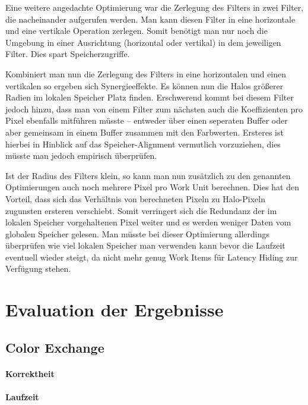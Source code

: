\documentclass[10pt,a4paper]{article}
\begin{document}
Eine weitere angedachte Optimierung war die Zerlegung des Filters in zwei Filter, die nacheinander aufgerufen werden. Man kann diesen Filter in eine horizontale und eine vertikale Operation zerlegen. Somit benötigt man nur noch die Umgebung in einer Ausrichtung (horizontal oder vertikal) in dem jeweiligen Filter. Dies spart Speicherzugriffe.


Kombiniert man nun die Zerlegung des Filters in eine horizontalen und einen vertikalen so ergeben sich Synergieeffekte. Es können nun die Halos größerer Radien im lokalen Speicher Platz finden. Erschwerend kommt bei diesem Filter jedoch hinzu, dass man von einem Filter zum nächsten auch die Koeffizienten pro Pixel ebenfalls mitführen müsste -- entweder über einen seperaten Buffer oder aber gemeinsam in einem Buffer zusammen mit den Farbwerten. Ersteres ist hierbei in Hinblick auf das Speicher-Alignment vermutlich vorzuziehen, dies müsste man jedoch empirisch überprüfen.

Ist der Radius des Filters klein, so kann man nun zusätzlich zu den genannten Optimierungen auch noch mehrere Pixel pro Work Unit berechnen. Dies hat den Vorteil, dass sich das Verhältnis von berechneten Pixeln zu Halo-Pixeln zugunsten ersteren verschiebt. Somit verringert sich die Redundanz der im lokalen Speicher vorgehaltenen Pixel weiter und es werden weniger Daten vom globalen Speicher gelesen. Man müsste bei dieser Optimierung allerdings überprüfen wie viel lokalen Speicher man verwenden kann bevor die Laufzeit eventuell wieder steigt, da nicht mehr genug Work Items für Latency Hiding zur Verfügung stehen.

\section{Evaluation der Ergebnisse}
\subsection{Color Exchange}
\paragraph{Korrektheit}
\paragraph{Laufzeit}
\end{document}
